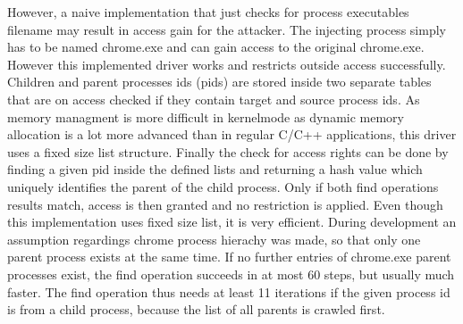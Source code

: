 However, a naive implementation that just checks for process executables filename may result in access gain for the attacker. The  injecting process simply has to be named chrome.exe and can gain access to the original chrome.exe. However this implemented driver works and restricts outside access successfully. Children and parent processes ids (pids) are stored inside two separate tables that are on access checked if they contain target and source process ids. As memory managment is more difficult in kernelmode as dynamic memory allocation is a lot more advanced than in regular C/C++ applications, this driver uses a fixed size list structure. Finally the check for access rights can be done by finding a given pid inside the defined lists and returning a hash value which uniquely identifies the parent of the child process. Only if both find operations results match, access is then granted and no restriction is applied. Even though this implementation uses fixed size list, it is very efficient. During development an assumption regardings chrome process hierachy was made, so that only one parent process exists at the same time. If no further entries of chrome.exe parent processes exist, the find operation succeeds in at most 60 steps, but usually much faster. The find operation thus needs at least 11 iterations if the given process id is from a child process, because the list of all parents is crawled first.
